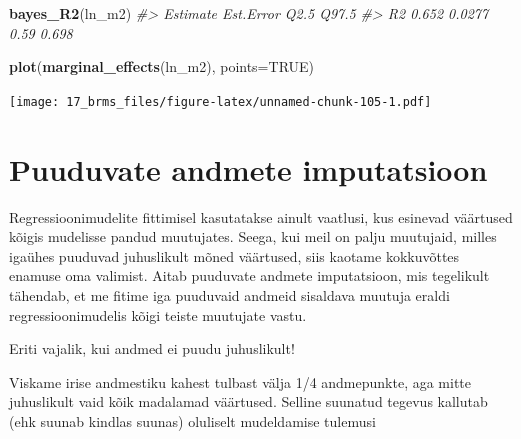 \documentclass[]{book}
\newenvironment{Shaded}{\begin{snugshade}}{\end{snugshade}}
\newcommand{\KeywordTok}[1]{\textcolor[rgb]{0.13,0.29,0.53}{\textbf{#1}}}
\newcommand{\DataTypeTok}[1]{\textcolor[rgb]{0.13,0.29,0.53}{#1}}
\newcommand{\DecValTok}[1]{\textcolor[rgb]{0.00,0.00,0.81}{#1}}
\newcommand{\FloatTok}[1]{\textcolor[rgb]{0.00,0.00,0.81}{#1}}
\newcommand{\StringTok}[1]{\textcolor[rgb]{0.31,0.60,0.02}{#1}}
\newcommand{\CommentTok}[1]{\textcolor[rgb]{0.56,0.35,0.01}{\textit{#1}}}
\newcommand{\OtherTok}[1]{\textcolor[rgb]{0.56,0.35,0.01}{#1}}
\newcommand{\OperatorTok}[1]{\textcolor[rgb]{0.81,0.36,0.00}{\textbf{#1}}}
\newcommand{\NormalTok}[1]{#1}
\begin{document}
\begin{Shaded}
\begin{Highlighting}[]
\KeywordTok{bayes_R2}\NormalTok{(ln_m2)}
\CommentTok{#>    Estimate Est.Error Q2.5 Q97.5}
\CommentTok{#> R2    0.652    0.0277 0.59 0.698}
\end{Highlighting}
\end{Shaded}

\begin{Shaded}
\begin{Highlighting}[]
\KeywordTok{plot}\NormalTok{(}\KeywordTok{marginal_effects}\NormalTok{(ln_m2), }\DataTypeTok{points=}\OtherTok{TRUE}\NormalTok{)}
\end{Highlighting}
\end{Shaded}

\texttt{[image: 17\_brms\_files/figure-latex/unnamed-chunk-105-1.pdf]}

\section{Puuduvate andmete
imputatsioon}\label{puuduvate-andmete-imputatsioon}

Regressioonimudelite fittimisel kasutatakse ainult vaatlusi, kus
esinevad väärtused kõigis mudelisse pandud muutujates. Seega, kui meil
on palju muutujaid, milles igaühes puuduvad juhuslikult mõned väärtused,
siis kaotame kokkuvõttes enamuse oma valimist. Aitab puuduvate andmete
imputatsioon, mis tegelikult tähendab, et me fitime iga puuduvaid
andmeid sisaldava muutuja eraldi regressioonimudelis kõigi teiste
muutujate vastu.

Eriti vajalik, kui andmed ei puudu juhuslikult!

Viskame irise andmestiku kahest tulbast välja 1/4 andmepunkte, aga mitte
juhuslikult vaid kõik madalamad väärtused. Selline suunatud tegevus
kallutab (ehk suunab kindlas suunas) oluliselt mudeldamise tulemusi

\begin{Shaded}
\end{Shaded}
\end{document}
